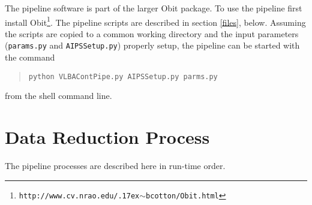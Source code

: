 \documentclass[10pt,onecolumn,final]{IEEEtran}
\renewcommand{\tilde}{\raise.17ex\hbox{$\scriptstyle\mathtt{\sim}$}}
\begin{document}
The pipeline software is part of the larger Obit package\cite{Cotton:Obit}.  To use the pipeline first install Obit\footnote{\tt http://www.cv.nrao.edu/{\tilde}bcotton/Obit.html}.  The pipeline scripts are described in section \ref{files}, below.  Assuming the scripts are copied to a common working directory and the input parameters ({\tt params.py} and {\tt AIPSSetup.py}) properly setup, the pipeline can be started with the command
\begin{quote}\tt python VLBAContPipe.py AIPSSetup.py parms.py\end{quote}
from the shell command line.

\section{Data Reduction Process}

The pipeline processes are described here in run-time order.
\end{document}
